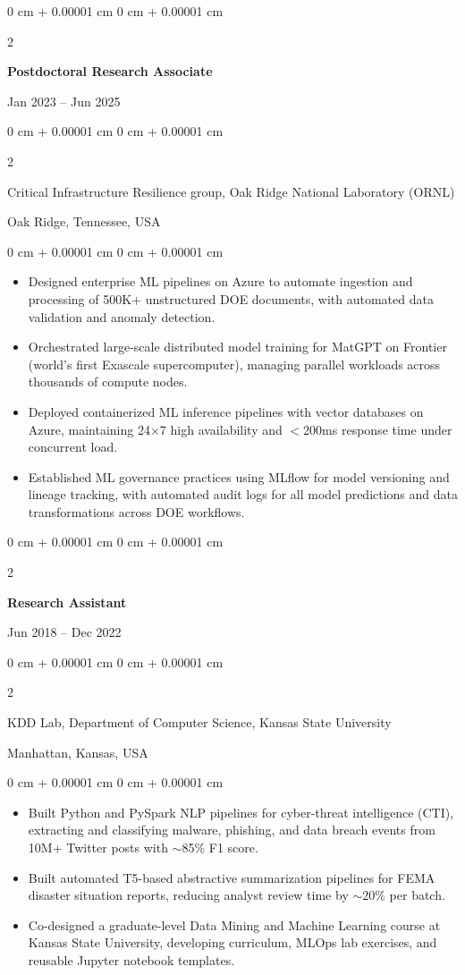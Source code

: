 \documentclass[10pt, letterpaper]{article}
\newenvironment{highlights}{
    \begin{itemize}[
        topsep=0.10 cm,
        parsep=0.10 cm,
        partopsep=0pt,
        itemsep=0pt,
        leftmargin=0 cm + 10pt
    ]
}{
    \end{itemize}
} %
\newenvironment{onecolentry}{
    \begin{adjustwidth}{
        0 cm + 0.00001 cm
    }{
        0 cm + 0.00001 cm
    }
}{
    \end{adjustwidth}
} %
\newenvironment{twocolentry}[2][]{
    \onecolentry
    \def\secondColumn{#2}
    \setcolumnwidth{\fill, 4.5 cm}
    \begin{paracol}{2}
}{
    \switchcolumn \raggedleft \secondColumn
    \end{paracol}
    \endonecolentry
} %
\begin{document}
    \begin{twocolentry}{Jan 2023 -- Jun 2025}
        \textbf{Postdoctoral Research Associate}
    \end{twocolentry}
    \begin{twocolentry}{Oak Ridge, Tennessee, USA}
        Critical Infrastructure Resilience group, Oak Ridge National Laboratory (ORNL)
    \end{twocolentry}
    \vspace{0.10 cm}
    \begin{onecolentry}
        \begin{highlights}
            \item Designed enterprise ML pipelines on Azure to automate ingestion and processing of 500K+ unstructured DOE documents, with automated data validation and anomaly detection.
            \item Orchestrated large-scale distributed model training for MatGPT on Frontier (world’s first Exascale supercomputer), managing parallel workloads across thousands of compute nodes.
            \item Deployed containerized ML inference pipelines with vector databases on Azure, maintaining 24×7 high availability and $<$200ms response time under concurrent load.
            \item Established ML governance practices using MLflow for model versioning and lineage tracking, with automated audit logs for all model predictions and data transformations across DOE workflows.
        \end{highlights}
    \end{onecolentry}

    \vspace{1mm}
    
    \begin{twocolentry}{Jun 2018 -- Dec 2022}
        \textbf{Research Assistant}
    \end{twocolentry}
    \begin{twocolentry}{Manhattan, Kansas, USA}
       KDD Lab, Department of Computer Science, Kansas State University
    \end{twocolentry}
    \vspace{0.10 cm}
    \begin{onecolentry}
        \begin{highlights}
            \item Built Python and PySpark NLP pipelines for cyber-threat intelligence (CTI), extracting and classifying malware, phishing, and data breach events from 10M+ Twitter posts with $\sim$85\% F1 score.
            \item Built automated T5-based abstractive summarization pipelines for FEMA disaster situation reports, reducing analyst review time by $\sim$20\% per batch.
            \item Co-designed a graduate-level Data Mining and Machine Learning course at Kansas State University, developing curriculum, MLOps lab exercises, and reusable Jupyter notebook templates.
        \end{highlights}
    \end{onecolentry}
\end{document}
